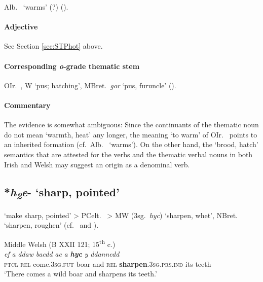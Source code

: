 \documentclass[output=paper,colorlinks,citecolor=brown]{langscibook}
\begin{document}
Alb.\  ‘warms’ (?) ().

\paragraph*{Adjective} 

See Section \ref{sec:STPhot} above.

\paragraph*{Corresponding \textit{o}-grade thematic stem} 

OIr.\  , W  ‘pus; hatching’, MBret.\ \textit{gor} ‘pus, furuncle’ ().

\paragraph*{Commentary}

The evidence is somewhat ambiguous: Since the continuants of the thematic noun do not mean ‘warmth, heat’ any longer, the meaning ‘to warm’ of OIr.\   points to an inherited formation (cf.\ Alb.\  ‘warms’). On the other hand, the ‘brood, hatch’ semantics that are attested for the verbs and the thematic verbal nouns in both Irish and Welsh may suggest an origin as a denominal verb.

\subsection{*\textit{h\textsubscript{2}e\kinvbreve }- ‘sharp, pointed’}
\label{sec:Caussharp}

 ‘make sharp, pointed’ > PCelt.\  > MW  (3sg.\ \textit{hyc}) ‘sharpen, whet’, NBret.\  ‘sharpen, roughen’ (cf.\ \citealt[158]{Schumacher2000} and \citealt[171--173]{Schulze-Thulin2001}).


\begin{exe}
    \ex Middle Welsh (B XXII 121; 15\textsuperscript{th} c.)\label{ex:Caussharp}\\
        \gll \textit{ef} \textit{a} \textit{ddaw} \textit{baedd} \textit{ac} \textit{a} {\textbf{\textit{hyc}} } \textit{y} \textit{ddannedd} \\
        \textsc{ptcl} \textsc{rel} come.\textsc{3sg.fut} boar and \textsc{rel} \textbf{sharpen}.\textsc{3sg.prs.ind} its teeth\\
        \glt ‘There comes a wild boar and sharpens its teeth.’\\
\end{exe}
\end{document}
